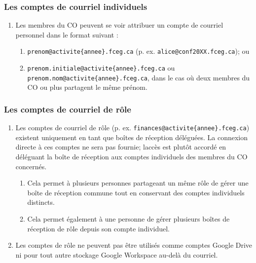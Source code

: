 \subsubsection{Les comptes de courriel individuels}
\label{les-comptes-de-courriel-individuels}

\begin{enumerate}
 \item
  Les membres du CO peuvent se voir attribuer un compte de courriel personnel dans le format suivant :
  \begin{enumerate}
   \item
    \texttt{prenom@activite\{annee\}.fceg.ca} (p. ex. \texttt{alice@conf20XX.fceg.ca}); ou
   \item
    \texttt{prenom.initiale@activite\{annee\}.fceg.ca} ou \texttt{prenom.nom@activite\{annee\}.fceg.ca}, dans le cas où deux membres du CO ou plus partagent le même prénom.
  \end{enumerate}
\end{enumerate}

\subsubsection{Les comptes de courriel de rôle}
\label{les-comptes-de-courriel-de-role}

\begin{enumerate}
 \item
  Les comptes de courriel de rôle (p. ex. \texttt{finances@activite\{annee\}.fceg.ca}) existent uniquement en tant que boîtes de réception déléguées. La connexion directe à ces comptes ne sera pas fournie; l\textquotesingle accès est plutôt accordé en déléguant la boîte de réception aux comptes individuels des membres du CO concernés.

  \begin{enumerate}
   \item
    Cela permet à plusieurs personnes partageant un même rôle de gérer une boîte de réception commune tout en conservant des comptes individuels distincts.
   \item
    Cela permet également à une personne de gérer plusieurs boîtes de réception de rôle depuis son compte individuel.
  \end{enumerate}

 \item
  Les comptes de rôle ne peuvent pas être utilisés comme comptes Google Drive ni pour tout autre stockage Google Workspace au-delà du courriel.
\end{enumerate}


